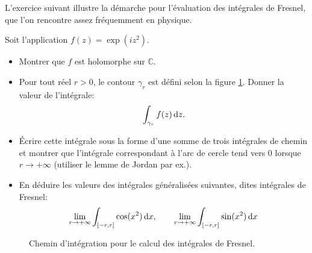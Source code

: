L'exercice suivant illustre la démarche pour l'évaluation des intégrales de Fresnel, que l'on rencontre assez fréquemment en physique.
\begin{exercice}
Soit l'application $f(z)=\exp\left(i z^2\right)$. 
\begin{itemize}
  \item Montrer que $f$ est holomorphe sur $\mathbb{C}$.
  \item Pour tout réel $r > 0$, le contour $\gamma_r$ est défini selon la figure
  \ref{fig:contour2}. Donner la valeur de l'intégrale:
  \[
  \int_{\gamma_r} f(z) \mathop{}\mathopen{}\mathrm{d} z.
  \]
  \item Écrire cette intégrale sous la forme d'une somme de trois
  intégrales de chemin et montrer que l'intégrale correspondant à l'arc de
  cercle tend vers $0$ lorsque $r \to +\infty$ (utiliser le lemme de Jordan par ex.).
  \item En déduire les valeurs des intégrales généralisées suivantes, dites
  intégrales de Fresnel:
  \[
  \lim_{r \to +\infty} \int_{[-r,r]} \cos(x^2) \mathop{}\mathopen{}\mathrm{d} x, \qquad  \lim_{r \to +\infty}
  \int_{[-r,r]} \sin(x^2) \mathop{}\mathopen{}\mathrm{d} x
  \]
\end{itemize}

\begin{figure}[H]
\begin{center}
\shorthandoff{!}\shorthandoff{:}
\shorthandon{!}\shorthandoff{:}
\caption{Chemin d'intégration pour le calcul des intégrales de Fresnel.}\label{fig:contour2}
\end{center}
\end{figure}



\end{exercice}
